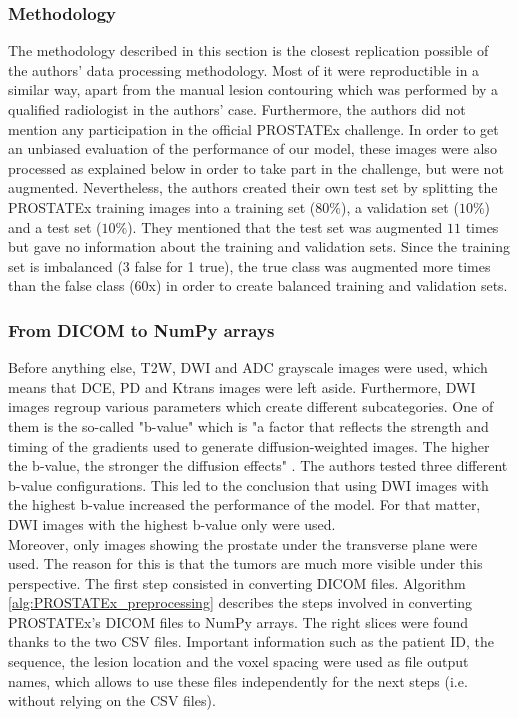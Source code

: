 \subsubsection{Methodology}
\setlength{\marginparwidth}{3cm}\leavevmode {}
The methodology described in this section is the closest replication possible of the authors' data processing methodology. Most of it were reproductible in a similar way, apart from the manual lesion contouring which was performed by a qualified radiologist in the authors' case. Furthermore, the authors did not mention any participation in the official PROSTATEx challenge. In order to get an unbiased evaluation of the performance of our model, these images were also processed as explained below in order to take part in the challenge, but were not augmented. Nevertheless, the authors created their own test set by splitting the PROSTATEx training images into a training set ($80\%$), a validation set ($10\%$) and a test set ($10\%$). They mentioned that the test set was augmented $11$ times but gave no information about the training and validation sets. Since the training set is imbalanced (3 false for 1 true), the true class was augmented more times than the false class ($60$x) in order to create balanced training and validation sets. 


\subsubsection{From DICOM to NumPy arrays}
\label{sec:DICOMtoNumPy}
\setlength{\marginparwidth}{3cm}\leavevmode {}Before anything else, T2W, DWI and ADC grayscale images were used, which means that DCE, PD and Ktrans images were left aside. Furthermore, DWI images regroup various parameters which create different subcategories. One of them is the so-called "b-value" which is "a factor that reflects the strength and timing of the gradients used to generate diffusion-weighted images. The higher the b-value, the stronger the diffusion effects" \cite{49}. The authors tested three different b-value configurations. This led to the conclusion that using DWI images with the highest b-value increased the performance of the model. For that matter, DWI images with the highest b-value only were used. \\
Moreover, only images showing the prostate under the transverse plane were used. The reason for this is that the tumors are much more visible under this perspective. 
The first step consisted in converting DICOM files. Algorithm \ref{alg:PROSTATEx_preprocessing} describes the steps involved in converting PROSTATEx's DICOM files to NumPy arrays. The right slices were found thanks to the two CSV files. Important information such as the patient ID, the sequence, the lesion location and the voxel spacing were used as file output names, which allows to use these files independently for the next steps (i.e. without relying on the CSV files). 

